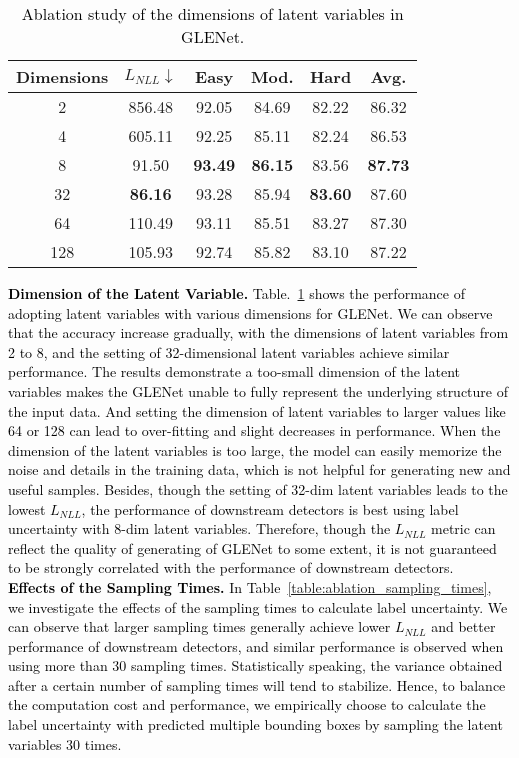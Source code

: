 \documentclass[twocolumn]{svjour3}
\newcommand{\revise}[1]{\textcolor{black}{#1}}
\begin{document}
\setlength{\tabcolsep}{7pt}
\begin{table}
	\centering
	\caption{\revise{Ablation study of the dimensions of latent variables in GLENet.}}
	\label{table:ablation_dim}
	\begin{tabular}{c|c|cccc} 
		\toprule
		Dimensions & $L_{NLL}$$\downarrow$ & Easy  & Mod.  & Hard  & Avg.   \\ 
		\hline
		2          & 856.48 & 92.05 & 84.69 & 82.22 & 86.32  \\
		4          & 605.11 & 92.25 & 85.11 & 82.24 & 86.53  \\
		8          & 91.50  & \textbf{93.49} & \textbf{86.15} & 83.56 & \textbf{87.73}  \\
		32         & \textbf{86.16}  & 93.28 & 85.94 & \textbf{83.60} & 87.60  \\
		64         & 110.49 & 93.11 & 85.51 & 83.27 & 87.30  \\
		128        & 105.93 & 92.74 & 85.82 & 83.10 & 87.22  \\
		\bottomrule
	\end{tabular}
\end{table}
\setlength{\tabcolsep}{1.5pt}

\noindent
\revise{
	\textbf{Dimension of the Latent Variable.} Table.~\ref{table:ablation_dim} shows the performance of adopting latent variables with various dimensions for GLENet. We can observe that the accuracy increase gradually, with the dimensions of latent variables from 2 to 8, and the setting of 32-dimensional latent variables achieve similar performance. The results demonstrate a too-small dimension of the latent variables makes the GLENet unable to fully represent the underlying structure of the input data. 
    And setting the dimension of latent variables to larger values like 64 or 128 can lead to over-fitting and slight decreases in performance. When the dimension of the latent variables is too large, the model can easily memorize the noise and details in the training data, which is not helpful for generating new and useful samples.
    Besides, though the setting of 32-dim latent variables leads to the lowest $L_{NLL}$, the performance of downstream detectors is best using label uncertainty with 8-dim latent variables. Therefore, though the $L_{NLL}$ metric can reflect the quality of generating of GLENet to some extent, it is not guaranteed to be strongly correlated with the performance of downstream detectors.
}\\

\noindent
\revise{
	\textbf{Effects of the Sampling Times.} In Table~\ref{table:ablation_sampling_times}, we investigate the effects of the sampling times to calculate label uncertainty. We can observe that larger sampling times generally achieve lower $L_{NLL}$ and better performance of downstream detectors, and similar performance is observed when using more than 30 sampling times. Statistically speaking, the variance obtained after a certain number of sampling times will tend to stabilize.
	Hence, to balance the computation cost and performance, we empirically choose to calculate the label uncertainty with predicted multiple bounding boxes by sampling the latent variables 30 times.
}
\end{document}
